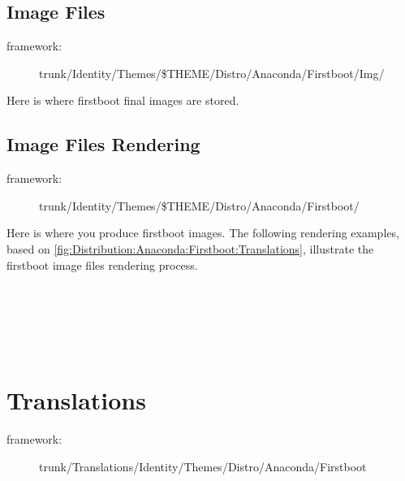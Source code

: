 \subsection{Image Files}
\hypertarget{sec:Distribution:Anaconda:Firstboot:Identity:Images}{}
\label{sec:Distribution:Anaconda:Firstboot:Identity:Images}

\begin{description}
\item[framework:]
trunk/Identity/Themes/\$THEME/Distro/Anaconda/Firstboot/Img/
\end{description}

\noindent Here is where firstboot final images are stored. 

\subsection{Image Files Rendering}
\hypertarget{sec:Distribution:Anaconda:Firstboot:Identity:ImagesRendering}{}
\label{sec:Distribution:Anaconda:Firstboot:Identity:ImagesRendering}

\begin{description}
\item[framework:]
trunk/Identity/Themes/\$THEME/Distro/Anaconda/Firstboot/
\end{description}

\noindent Here is where you produce firstboot images. The following
rendering examples, based on
\autoref{fig:Distribution:Anaconda:Firstboot:Translations}, illustrate
the firstboot image files rendering process.\\
\\
\\
\\
\\
\\

\section{Translations}
\hypertarget{sec:Distribution:Anaconda:Firstboot:Translations}{}
\label{sec:Distribution:Anaconda:Firstboot:Translations}

\begin{description}
\item[framework:]
trunk/Translations/Identity/Themes/Distro/Anaconda/Firstboot
\end{description}


